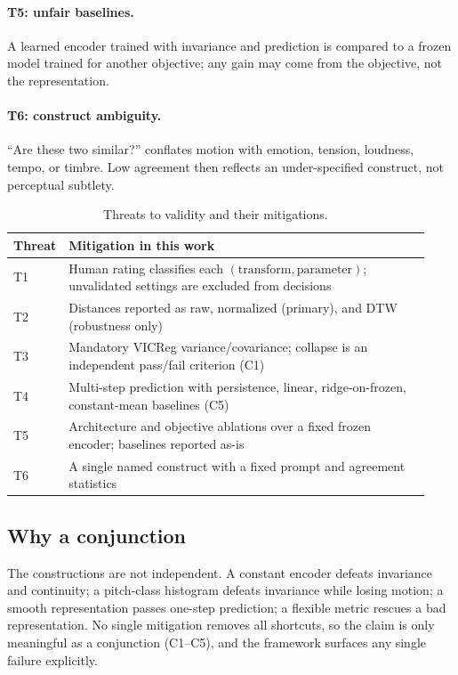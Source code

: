 \documentclass[11pt]{article}
\begin{document}
\paragraph{T5: unfair baselines.}
A learned encoder trained with invariance and prediction is compared to a frozen
model trained for another objective; any gain may come from the objective, not the
representation.

\paragraph{T6: construct ambiguity.}
``Are these two similar?'' conflates motion with emotion, tension, loudness,
tempo, or timbre. Low agreement then reflects an under-specified construct, not
perceptual subtlety.

\begin{table}[t]
\centering
\small
\begin{tabular}{@{}p{0.05\linewidth}p{0.88\linewidth}@{}}
\toprule
Threat & Mitigation in this work \\
\midrule
T1 & Human rating classifies each $(\text{transform},\text{parameter})$;
unvalidated settings are excluded from decisions \\
T2 & Distances reported as raw, normalized (primary), and DTW (robustness only) \\
T3 & Mandatory VICReg variance/covariance; collapse is an independent pass/fail
criterion (C1) \\
T4 & Multi-step prediction with persistence, linear, ridge-on-frozen, constant-mean
baselines (C5) \\
T5 & Architecture and objective ablations over a fixed frozen encoder; baselines
reported as-is \\
T6 & A single named construct with a fixed prompt and agreement statistics \\
\bottomrule
\end{tabular}
\caption{Threats to validity and their mitigations.}
\label{tab:threats}
\end{table}

\subsection{Why a conjunction}
\label{sec:conjunction}
The constructions are not independent. A constant encoder defeats invariance and
continuity; a pitch-class histogram defeats invariance while losing motion; a
smooth representation passes one-step prediction; a flexible metric rescues a bad
representation. No single mitigation removes all shortcuts, so the claim is only
meaningful as a conjunction (C1--C5), and the framework surfaces any single
failure explicitly.
\end{document}
